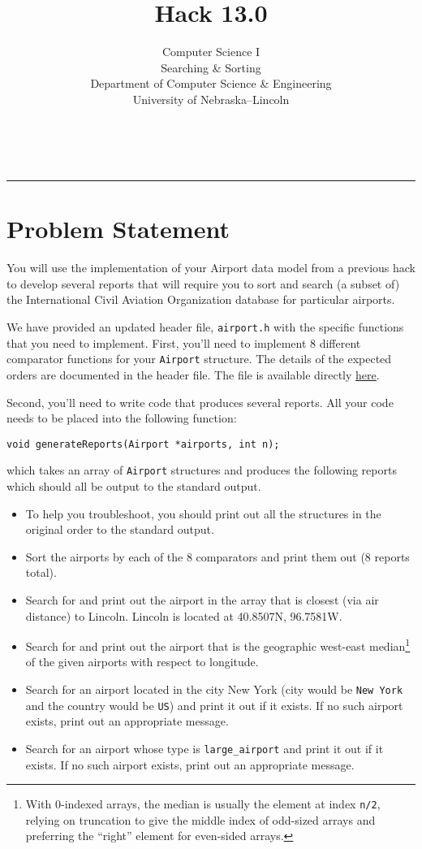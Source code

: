 \documentclass[12pt]{scrartcl}
\title{Hack 13.0}\let\Title\@title
\subtitle{Computer Science I\\
Searching \& Sorting\\
{\small
\vskip1cm
Department of Computer Science \& Engineering \\
University of Nebraska--Lincoln}
\vskip-3cm}
\date{~}
\begin{document}
\maketitle

\hrule



\section*{Problem Statement}

You will use the implementation of your Airport data model from a previous
hack to develop several reports that will require you to sort and search
(a subset of) the International Civil Aviation Organization database for
particular airports.  

We have provided an updated header file, \texttt{airport.h} with
the specific functions that you need to implement.  First, you'll need to
implement 8 different comparator functions for your \texttt{Airport}
structure.  The details of the expected orders are documented in the header
file.  The file is available directly \href{https://github.com/cbourke/ComputerScienceI/blob/master/hacks/hack13.0-files/airport.h}{here}.

Second, you'll need to write code that produces several reports.  All your
code needs to be placed into the following function:

\texttt{void generateReports(Airport *airports, int n);}

which takes an array of \texttt{Airport} structures and produces the
following reports which should all be output to the standard output.

\begin{itemize}
  \item To help you troubleshoot, you should print out all the structures
  in the original order to the standard output.
  \item Sort the airports by each of the 8 comparators and print them 
  out (8 reports total).
  \item Search for and print out the airport in the array that is closest (via 
  air distance) to Lincoln.  Lincoln is located at 40.8507N, 96.7581W.
  \item Search for and print out the airport that is the geographic west-east
  median\footnote{With 0-indexed arrays, the median is usually the element at
  index \texttt{n/2}, relying on truncation to give the middle index of
  odd-sized arrays and preferring the ``right'' element for even-sided arrays.} 
  of the given airports with respect to longitude.  
  \item Search for an airport located in the city New York (city would 
  be \texttt{New York} and the country would be 
  \texttt{US}) and print it out
  if it exists.  If no such airport exists, print out an appropriate message.
  \item Search for an airport whose type is \texttt{large_airport} and
  print it out if it exists.  If no such airport exists, print out an appropriate message.
\end{itemize}
\end{document}
